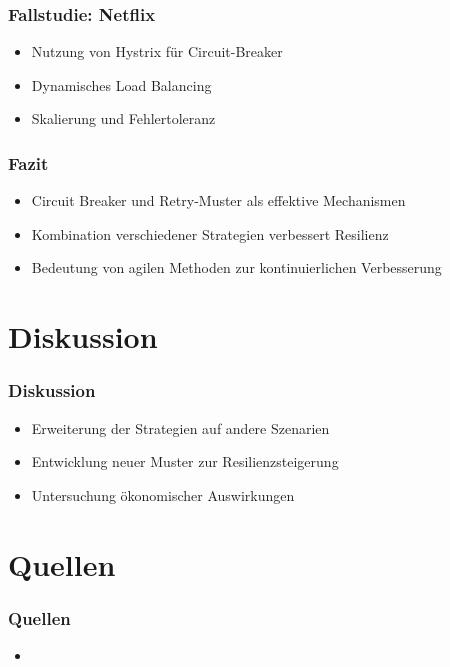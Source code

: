 \begin{frame}
    \frametitle{Fallstudie: Netflix}
    \begin{itemize}
        \item Nutzung von Hystrix für Circuit-Breaker
        \item Dynamisches Load Balancing
        \item Skalierung und Fehlertoleranz
    \end{itemize}
\end{frame}


\begin{frame}
    \frametitle{Fazit}
    \begin{itemize}
        \item Circuit Breaker und Retry-Muster als effektive Mechanismen
        \item Kombination verschiedener Strategien verbessert Resilienz
        \item Bedeutung von agilen Methoden zur kontinuierlichen Verbesserung
    \end{itemize}
\end{frame}

\section{Diskussion}

\begin{frame}
    \frametitle{Diskussion}
    \begin{itemize}
        \item Erweiterung der Strategien auf andere Szenarien
        \item Entwicklung neuer Muster zur Resilienzsteigerung
        \item Untersuchung ökonomischer Auswirkungen
    \end{itemize}
\end{frame}

\section{Quellen}

\begin{frame}
    \frametitle{Quellen}
    \begin{itemize}
        \item 
    \end{itemize}
\end{frame}
